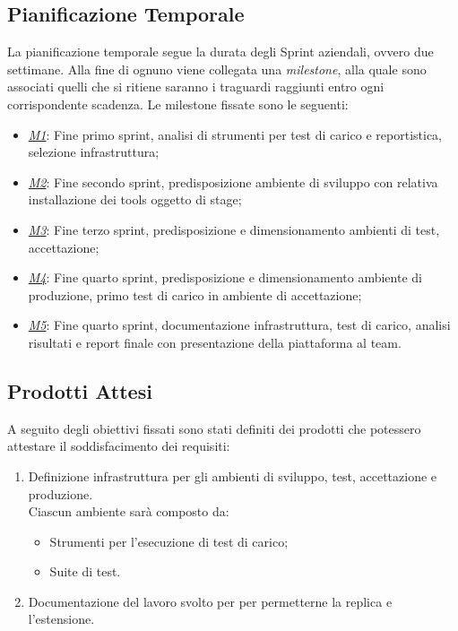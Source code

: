 \subsection{Pianificazione Temporale}
La pianificazione temporale segue la durata degli Sprint aziendali, ovvero due settimane. Alla fine di ognuno viene collegata una \textit{milestone}, alla quale sono associati quelli che si ritiene saranno i traguardi raggiunti entro ogni corrispondente scadenza.
Le milestone fissate sono le seguenti:
\begin{itemize}
	\item \underline{\textit{M1}}: Fine primo sprint, analisi di strumenti per test di carico e reportistica, selezione infrastruttura;
	\item \underline{\textit{M2}}: Fine secondo sprint, predisposizione ambiente di sviluppo con relativa installazione dei tools oggetto di stage;
	\item \underline{\textit{M3}}: Fine terzo sprint, predisposizione e dimensionamento ambienti di test, accettazione;
	\item \underline{\textit{M4}}: Fine quarto sprint, predisposizione e dimensionamento ambiente di produzione, primo test di carico in ambiente di accettazione;
	\item \underline{\textit{M5}}: Fine quarto sprint, documentazione infrastruttura, test di carico, analisi risultati e report finale con presentazione della piattaforma al team.
\end{itemize}
\subsection{Prodotti Attesi}
A seguito degli obiettivi fissati sono stati definiti dei prodotti che potessero attestare il soddisfacimento dei requisiti:
\begin{enumerate}
	\item Definizione infrastruttura per gli ambienti di sviluppo, test, accettazione e produzione.\\ 
	Ciascun ambiente sarà composto da:
	\begin{itemize}
		\item Strumenti per l'esecuzione di test di carico;
		\item Suite di test.
	\end{itemize}
	\item Documentazione del lavoro svolto per per permetterne la replica e l'estensione.
\end{enumerate}

